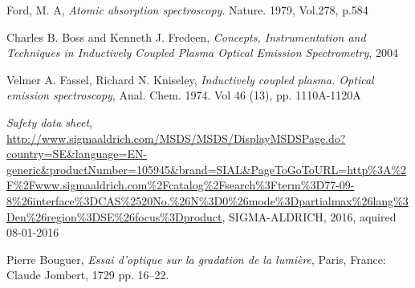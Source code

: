 \documentclass[11pt]{article}
\begin{document}

\clearpage


\clearpage

\clearpage

\clearpage

\clearpage

\clearpage

\clearpage

\clearpage
\begin{thebibliography}{9}
        Ford, M. A,
        \emph{Atomic absorption spectroscopy}.
        Nature. 1979, Vol.278, p.584

        Charles B. Boss and Kenneth J. Fredeen,
        \emph{Concepts, Instrumentation and Techniques in Inductively Coupled Plasma Optical Emission Spectrometry},
        2004

        Velmer A. Fassel, Richard N. Kniseley,
        \emph{Inductively coupled plasma. Optical emission spectroscopy},
        Anal. Chem. 1974. Vol 46 (13), pp. 1110A-1120A

        \emph{Safety data sheet},
\url{http://www.sigmaaldrich.com/MSDS/MSDS/DisplayMSDSPage.do?country=SE&language=EN-generic&productNumber=105945&brand=SIAL&PageToGoToURL=http%3A%2F%2Fwww.sigmaaldrich.com%2Fcatalog%2Fsearch%3Fterm%3D77-09-8%26interface%3DCAS%2520No.%26N%3D0%26mode%3Dpartialmax%26lang%3Den%26region%3DSE%26focus%3Dproduct},
    SIGMA-ALDRICH, 2016, aquired 08-01-2016

        Pierre Bouguer,
        \emph{Essai d'optique sur la gradation de la lumière},
        Paris, France: Claude Jombert, 1729 pp. 16–22.



\end{thebibliography}
\clearpage

\appendix
\begin{appendices}
  
\end{appendices}
\end{document}
